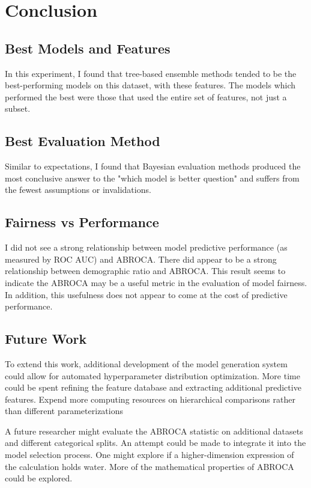\documentclass{article}
\begin{document}
\section{Conclusion}

    \subsection{Best Models and Features}
        In this experiment, I found that tree-based ensemble methods tended to be the best-performing models on this dataset, with these features.
        The models which performed the best were those that used the entire set of features, not just a subset.
        
    \subsection{Best Evaluation Method}
        Similar to expectations, I found that Bayesian evaluation methods produced the most conclusive answer to the "which model is better question" and suffers from the fewest assumptions or invalidations.

        
    \subsection{Fairness vs Performance}
        I did not see a strong relationship between model predictive performance (as measured by ROC AUC) and ABROCA.
        There did appear to be a strong relationship between demographic ratio and ABROCA.
        This result seems to indicate the ABROCA may be a useful metric in the evaluation of model fairness.
        In addition, this usefulness does not appear to come at the cost of predictive performance.

    \subsection{Future Work}
        To extend this work, additional development of the model generation system could allow for automated hyperparameter distribution optimization.
        More time could be spent refining the feature database and extracting additional predictive features.
        Expend more computing resources on hierarchical comparisons rather than different parameterizations 
        
        A future researcher might evaluate the ABROCA statistic on additional datasets and different categorical splits.
        An attempt could be made to integrate it into the model selection process.
        One might explore if a higher-dimension expression of the calculation holds water.
        More of the mathematical properties of ABROCA could be explored.



        
        
    
\end{document}
